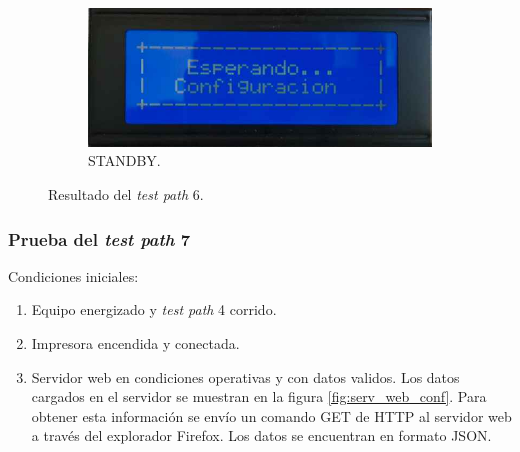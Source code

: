 \begin{figure}[!htpb]
\begin{subfigure}[b]{0.4\textwidth}
     \end{subfigure}
           \hfill
     \begin{subfigure}[b]{0.4\textwidth}
         \centering
         \includegraphics[width=1.1\textwidth]{./Figures/Esp_Conf.jpeg}
         \caption{STANDBY.}
         \label{fig:pruConf_6_4}
     \end{subfigure}
        \caption{Resultado del \textit{test path} 6.}
        \label{fig:pruConf_6_res}
\end{figure}

\pagebreak

\subsubsection{Prueba del \textit{test path} 7}
\label{subsubsec:pruConf_7}

Condiciones iniciales: 

\begin{enumerate}
	\item Equipo energizado y \textit{test path} 4 corrido.
	\item Impresora encendida y conectada.
	\item Servidor web en condiciones operativas y con datos validos. Los datos cargados en el servidor se muestran en la figura \ref{fig:serv_web_conf}. Para obtener esta información se envío un comando GET de HTTP al servidor web a través del explorador Firefox. Los datos se encuentran en formato JSON.
\end{enumerate}

